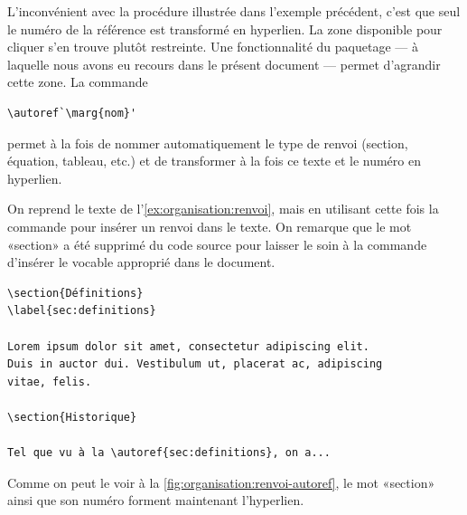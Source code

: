 L'inconvénient avec la procédure illustrée dans l'exemple précédent,
c'est que seul le numéro de la référence est transformé en hyperlien.
La zone disponible pour cliquer s'en trouve plutôt restreinte. Une
fonctionnalité du paquetage  --- à laquelle nous avons eu
recours dans le présent document --- permet d'agrandir cette zone. La
commande
\begin{lstlisting}
\autoref`\marg{nom}'
\end{lstlisting}
permet à la fois de nommer automatiquement le type de renvoi (section,
équation, tableau, etc.) et de transformer à la fois ce texte et le
numéro en hyperlien.

\begin{exemple}
  \label{ex:organisation:renvoi-autoref}
  On reprend le texte de l'\autoref{ex:organisation:renvoi}, mais en
  utilisant cette fois la commande \cmd{\autoref} pour insérer un
  renvoi dans le texte. On remarque que le mot «section» a été
  supprimé du code source pour laisser le soin à la commande d'insérer
  le vocable approprié dans le document.
\begin{lstlisting}[emph={\label,\autoref}]
\section{Définitions}
\label{sec:definitions}

Lorem ipsum dolor sit amet, consectetur adipiscing elit.
Duis in auctor dui. Vestibulum ut, placerat ac, adipiscing
vitae, felis.

\section{Historique}

Tel que vu à la \autoref{sec:definitions}, on a...
\end{lstlisting}
  Comme on peut le voir à la
  \autoref{fig:organisation:renvoi-autoref}, le mot «section» ainsi
  que son numéro forment maintenant l'hyperlien.


\end{exemple}
